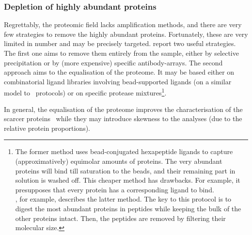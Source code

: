 \subsubsection{Depletion of highly abundant proteins}

Regrettably, the proteomic field lacks amplification methods, and
there are very few strategies to remove the highly abundant proteins. Fortunately,
these are very limited in number and may be precisely targeted.
\citet{Zhang2014} report two useful strategies. The first one aims to remove
them entirely from the sample, either by selective
precipitation or by (more expensive) specific antibody-arrays.
The second approach aims to the equalisation of the proteome.
It may be based either on combinatorial ligand libraries involving
bead-supported ligands (on a similar model to \Rnaseq\ protocols)
or on specific protease mixtures\footnote{The former method uses bead-conjugated
hexapeptide ligands to capture (approximatively) equimolar amounts of proteins.
The very abundant proteins will bind till saturation to the beads, and their
remaining part in solution is washed off. This cheaper method has drawbacks.
For example, it presupposes that every protein has a corresponding ligand to bind.
\\\citet{MichaelMentenDepletion}, for example, describes the latter method. The
key to this protocol is to digest the most abundant proteins in peptides while
keeping the bulk of the other proteins intact.
Then, the peptides are removed by filtering their molecular size.}.

In general, the equalisation of the proteome improves the characterisation
of the scarcer proteins~ while they may introduce skewness
to the analyses (due to the relative protein proportions).

